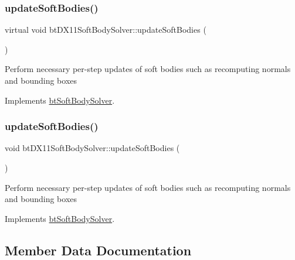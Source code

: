 \subsubsection{\texorpdfstring{update\+Soft\+Bodies()}{updateSoftBodies()}\hspace{0.1cm}{\footnotesize\ttfamily [1/2]}}
{\footnotesize\ttfamily virtual void bt\+D\+X11\+Soft\+Body\+Solver\+::update\+Soft\+Bodies (\begin{DoxyParamCaption}{ }\end{DoxyParamCaption})\hspace{0.3cm}{\ttfamily [virtual]}}

Perform necessary per-\/step updates of soft bodies such as recomputing normals and bounding boxes 

Implements \hyperlink{classbtSoftBodySolver_adac4b4f20eee46dc4fab26ed25be89ef}{bt\+Soft\+Body\+Solver}.

\mbox{\label{classbtDX11SoftBodySolver_a14550caa4b6eb1be4c47cef4a4b40336}} 
\subsubsection{\texorpdfstring{update\+Soft\+Bodies()}{updateSoftBodies()}\hspace{0.1cm}{\footnotesize\ttfamily [2/2]}}
{\footnotesize\ttfamily void bt\+D\+X11\+Soft\+Body\+Solver\+::update\+Soft\+Bodies (\begin{DoxyParamCaption}{ }\end{DoxyParamCaption})\hspace{0.3cm}{\ttfamily [virtual]}}

Perform necessary per-\/step updates of soft bodies such as recomputing normals and bounding boxes 

Implements \hyperlink{classbtSoftBodySolver_adac4b4f20eee46dc4fab26ed25be89ef}{bt\+Soft\+Body\+Solver}.



\subsection{Member Data Documentation}
\mbox{\label{classbtDX11SoftBodySolver_a9a817decf988b55a5e93e7562f6ff83f}} 
